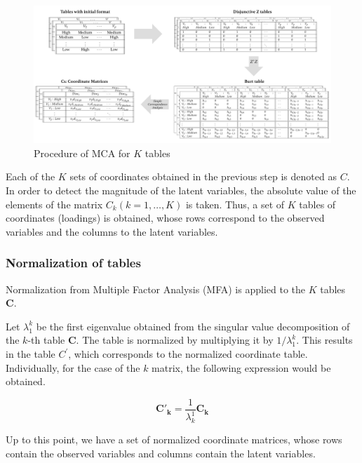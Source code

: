 \documentclass[mathematics,article,submit,moreauthors,pdftex]{mdpi}
\begin{document}
\begin{figure}[!ht]


\begin{center}\includegraphics[width=0.9\linewidth,]{ktablesMCAi} \end{center}

\caption{Procedure of MCA for $K$ tables}

\label{fig:MCAk}
\end{figure}

Each of the \(K\) sets of coordinates obtained in the previous step is
denoted as \(C\). In order to detect the magnitude of the latent
variables, the absolute value of the elements of the matrix
\(C_{k} (k=1,…, K)\) is taken. Thus, a set of \(K\) tables of
coordinates (loadings) is obtained, whose rows correspond to the
observed variables and the columns to the latent variables.

\hypertarget{normalization-of-tables}{%
\subsubsection{Normalization of tables}\label{normalization-of-tables}}

Normalization \citep{AFM} from Multiple Factor Analysis (MFA) is applied
to the \(K\) tables \textbf{C}.

Let \(\lambda_{1}^{k}\) be the first eigenvalue obtained from the
singular value decomposition of the \(k\)-th table \textbf{C}. The table
is normalized by multiplying it by \(1/\lambda_{1}^{k}\). This results
in the table \(C^{'}\), which corresponds to the normalized coordinate
table. Individually, for the case of the \(k\) matrix, the following
expression would be obtained.

\begin{equation}
\mathbf{C'_k}=\frac{1}{\lambda_{k}^1} \mathbf{C_k}
\label{eq:Cprimak}
\end{equation}

Up to this point, we have a set of normalized coordinate matrices, whose
rows contain the observed variables and columns contain the latent
variables.
\end{document}
